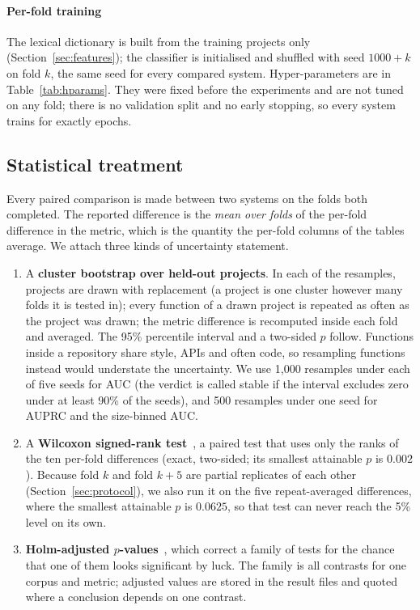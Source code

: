 \paragraph{Per-fold training} The lexical dictionary is built from the training
projects only (Section~\ref{sec:features}); the classifier is initialised and
shuffled with seed $1000+k$ on fold $k$, the same seed for every compared
system. Hyper-parameters are in Table~\ref{tab:hparams}. They were fixed before
the experiments and are not tuned on any fold; there is no validation split and
no early stopping, so every system trains for exactly \numcfgEpochs{} epochs.



\subsection{Statistical treatment}
\label{sec:stats}
Every paired comparison is made between two systems on the folds both
completed. The reported difference is the \emph{mean over folds} of the
per-fold difference in the metric, which is the quantity the per-fold columns of
the tables average. We attach three kinds of uncertainty statement.
\begin{enumerate}
    \item A \textbf{cluster bootstrap over held-out projects}. In each of the
          resamples, projects are drawn with replacement (a project is one
          cluster however many folds it is tested in); every function of a drawn
          project is repeated as often as the project was drawn; the metric
          difference is recomputed inside each fold and averaged. The 95\%
          percentile interval and a two-sided $p$ follow. Functions inside a
          repository share style, APIs and often code, so resampling functions
          instead would understate the uncertainty. We use 1{,}000 resamples
          under each of five seeds for AUC (the verdict is called stable if the
          interval excludes zero under at least 90\% of the seeds), and 500
          resamples under one seed for AUPRC and the size-binned AUC.
    \item A \textbf{Wilcoxon signed-rank test}~\cite{wilcoxon1945individual}, a
          paired test that uses only the ranks of the ten per-fold differences
          (exact, two-sided; its smallest attainable $p$ is $0.002$). Because
          fold $k$ and fold $k+5$ are partial replicates of each other
          (Section~\ref{sec:protocol}), we also run it on the five
          repeat-averaged differences, where the smallest attainable $p$ is
          $0.0625$, so that test can never reach the 5\% level on its own.
    \item \textbf{Holm-adjusted $p$-values}~\cite{holm1979simple}, which
          correct a family of tests for the chance that one of them looks
          significant by luck. The family is all contrasts for one corpus and
          metric; adjusted values are stored in the result files and quoted where
          a conclusion depends on one contrast.
\end{enumerate}
